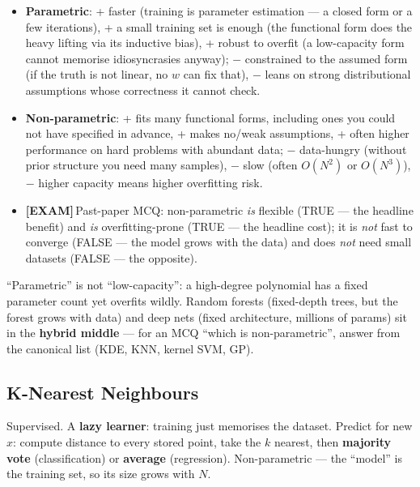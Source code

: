 \documentclass[11pt, a4paper]{article}
\newcommand{\examflag}{\textcolor{tipBd}{\textbf{[EXAM]}}\,}
\newcommand{\kw}[1]{\textbf{#1}}
\begin{document}
\begin{itemize}
  \item \kw{Parametric}: + faster (training is parameter estimation — a closed form or a few
  iterations), + a small training set is enough (the functional form does the heavy lifting via its
  inductive bias), + robust to overfit (a low-capacity form cannot memorise idiosyncrasies anyway);
  $-$ constrained to the assumed form (if the truth is not linear, no $w$ can fix that), $-$ leans
  on strong distributional assumptions whose correctness it cannot check.
  \item \kw{Non-parametric}: + fits many functional forms, including ones you could not have
  specified in advance, + makes no/weak assumptions, + often higher performance on hard problems
  with abundant data; $-$ data-hungry (without prior structure you need many samples), $-$ slow
  (often $O(N^2)$ or $O(N^3)$), $-$ higher capacity means higher overfitting risk.
  \item \examflag{}Past-paper MCQ: non-parametric \emph{is} flexible (TRUE — the headline benefit)
  and \emph{is} overfitting-prone (TRUE — the headline cost); it is \emph{not} fast to converge
  (FALSE — the model grows with the data) and does \emph{not} need small datasets (FALSE — the
  opposite).
\end{itemize}

\begin{trapbox}
``Parametric'' is not ``low-capacity'': a high-degree polynomial has a fixed parameter count yet
overfits wildly. Random forests (fixed-depth trees, but the forest grows with data) and deep nets
(fixed architecture, millions of params) sit in the \kw{hybrid middle} — for an MCQ ``which is
non-parametric'', answer from the canonical list (KDE, KNN, kernel SVM, GP).
\end{trapbox}

\subsection{K-Nearest Neighbours}

\begin{defbox}[KNN]
Supervised. A \kw{lazy learner}: training just memorises the dataset. Predict for new $x$: compute
distance to every stored point, take the $k$ nearest, then \kw{majority vote} (classification) or
\kw{average} (regression). Non-parametric — the ``model'' is the training set, so its size grows
with $N$.
\end{defbox}
\end{document}
